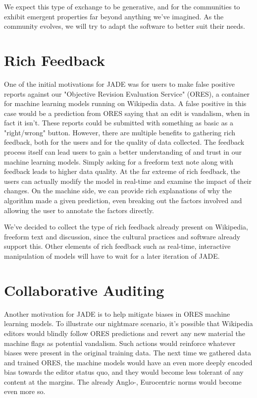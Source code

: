 \documentclass{sigchi-ext}
\begin{document}
We expect this type of exchange to be generative, and for the communities to exhibit emergent properties far beyond anything we've imagined.  As the community evolves, we will try to adapt the software to better suit their needs.

\section{Rich Feedback}

One of the initial motivations for JADE was for users to make false positive reports against our "Objective Revision Evaluation Service" (ORES), a container for machine learning models running on Wikipedia data.  A false positive in this case would be a prediction from ORES saying that an edit is vandalism, when in fact it isn't.  These reports could be submitted with something as basic as a "right/wrong" button.  However, there are multiple benefits to gathering rich feedback, both for the users and for the quality of data collected.  The feedback process itself can lead users to gain a better understanding of and trust in our machine learning models.  Simply asking for a freeform text note along with feedback leads to higher data quality.  At the far extreme of rich feedback, the users can actually modify the model in real-time and examine the impact of their changes.\cite{amershi2014power} \cite{stumpf2009interacting}  On the machine side, we can provide rich explanations of why the algorithm made a given prediction, even breaking out the factors involved and allowing the user to annotate the factors directly.

We've decided to collect the type of rich feedback already present on Wikipedia, freeform text and discussion, since the cultural practices and software already support this.  Other elements of rich feedback such as real-time, interactive manipulation of models will have to wait for a later iteration of JADE.

\section{Collaborative Auditing}

Another motivation for JADE is to help mitigate biases in ORES machine learning models.  To illustrate our nightmare scenario, it's possible that Wikipedia editors would blindly follow ORES predictions and revert any new material the machine flags as potential vandalism.  Such actions would reinforce whatever biases were present in the original training data.  The next time we gathered data and trained ORES, the machine models would have an even more deeply encoded bias towards the editor status quo, and they would become less tolerant of any content at the margins.  The already Anglo-, Eurocentric norms\cite{ford2013getting} would become even more so.
\end{document}
